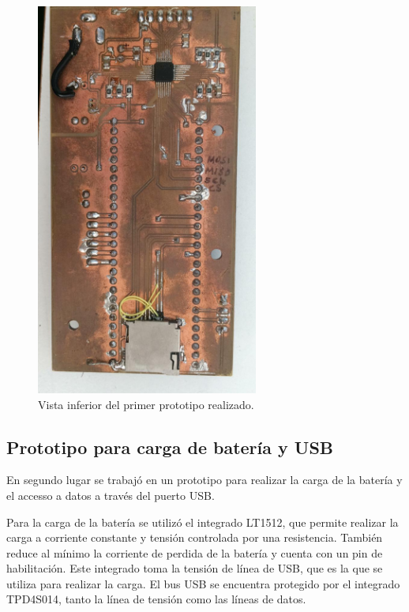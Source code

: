 \begin{figure}[!htbp]
	\centering
	
	\includegraphics[angle = 90, width=0.65\textwidth]{./Figures/prototipo12.jpeg}		
	\caption{Vista inferior del primer prototipo realizado.}
	\label{fig:prototipo1inf}
\end{figure}


\subsection{Prototipo para carga de batería y USB}

En segundo lugar se trabajó en un prototipo para realizar la carga de la batería y el accesso a datos a través del puerto USB. 

Para la carga de la batería se utilizó el integrado LT1512, que permite realizar la carga a corriente constante y tensión controlada por una resistencia. También reduce al mínimo la corriente de perdida de la batería y cuenta con un pin de habilitación. Este integrado toma la tensión de línea de USB, que es la que se utiliza para realizar la carga. El bus USB se encuentra protegido por el integrado TPD4S014, tanto la línea de tensión como las líneas de datos.


